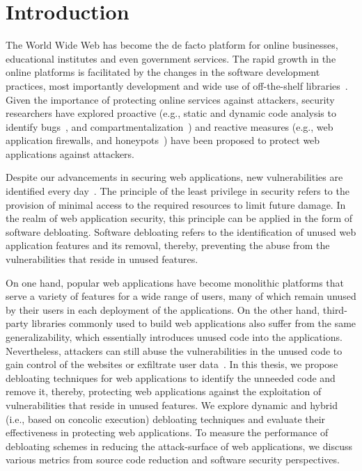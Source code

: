 \chapter{Introduction}

The World Wide Web has become the de facto platform for online businesses, educational institutes and even government services. 
The rapid growth in the online platforms is facilitated by the changes in the software development practices, most importantly development and wide use of off-the-shelf libraries~\cite{packagiststats, npmstatistics, pypi}. 
Given the importance of protecting online services against attackers, security researchers have explored proactive (e.g., static and dynamic code analysis to identify bugs~\cite{jovanovic2006pixy, dahse2010rips, alhuzali2018navex}, and 
compartmentalization~\cite{vasilakis2018breakapp}) and reactive measures (e.g., web application firewalls, and honeypots~\cite{makiou2014improving, barron2021click}) have been proposed to protect web applications against attackers. 

Despite our advancements in securing web applications, new vulnerabilities are identified every day~\cite{cvedetails}. 
The principle of the least privilege in security refers to the provision of minimal access to the required resources to limit future damage. 
In the realm of web application security, this principle can be applied in the form of software debloating. 
Software debloating refers to the identification of unused web application features and its removal, thereby, preventing the abuse from the vulnerabilities that reside in unused features. 

On one hand, popular web applications have become monolithic platforms that serve a variety of features for a wide range of users, many of which remain unused by their users in each deployment of the applications. 
On the other hand, third-party libraries commonly used to build web applications also suffer from the same generalizability, which essentially introduces unused code into the applications. 
Nevertheless, attackers can still abuse the vulnerabilities in the unused code to gain control of the websites or exfiltrate user data~\cite{drupalVulenrability, zendVulnerability, phpunitVulnerability, PHPGGC}. 
In this thesis, we propose debloating techniques for web applications to identify the unneeded code and remove it, thereby, protecting web applications against the exploitation of vulnerabilities that reside in unused features. 
We explore dynamic and hybrid (i.e., based on concolic execution) debloating techniques and evaluate their effectiveness in protecting web applications. 
To measure the performance of debloating schemes in reducing the attack-surface of web applications, we discuss various metrics from source code reduction and software security perspectives. 



